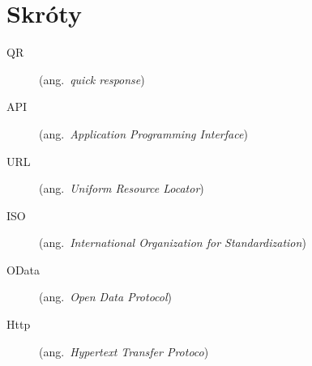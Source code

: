 \chapter*{Skróty}\mbox{}
\label{sec:skroty}
\noindent
\begin{description}
  \item [QR] (ang.\ \emph{quick response}) %
  \item [API] (ang.\ \emph{Application Programming Interface})
  \item [URL] (ang.\ \emph{Uniform Resource Locator})
  \item [ISO] (ang.\ \emph{International Organization for Standardization})
  \item [OData] (ang.\ \emph{Open Data Protocol})
  \item [Http] (ang.\ \emph{Hypertext Transfer Protoco})
\end{description}
